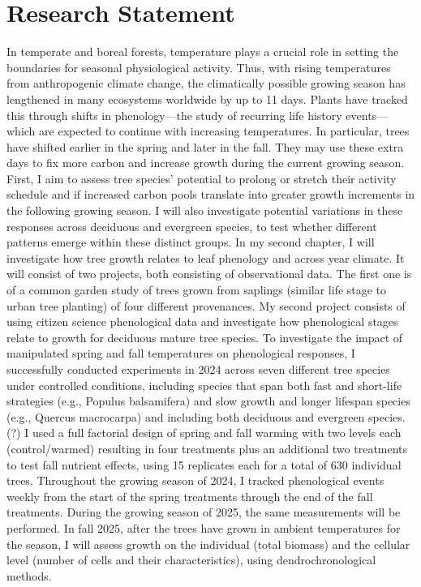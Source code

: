 \documentclass[11pt,letter]{article}
\begin{document}
\section {Research Statement}
In temperate and boreal forests, temperature plays a crucial role in setting the boundaries for seasonal physiological activity. Thus, with rising temperatures from anthropogenic climate change, the climatically possible growing season has lengthened in many ecosystems worldwide by up to 11 days. Plants have tracked this through shifts in phenology—the study of recurring life history events—which are expected to continue with increasing temperatures. In particular, trees have shifted earlier in the spring and later in the fall. They may use these extra days to fix more carbon and increase growth during the current growing season.\\
First, I aim to assess tree species’ potential to prolong or stretch their activity schedule and if increased carbon pools translate into greater growth increments in the following growing season. I will also investigate potential variations in these responses across
deciduous and evergreen species, to test whether different patterns emerge within these distinct groups.
In my second chapter, I will investigate how tree growth relates to leaf phenology and across year climate. It will consist of two projects, both consisting of observational data. The first one is of a common garden study of trees grown from saplings (similar life stage to urban tree planting) of four different provenances. My second project consists of using citizen science phenological data and investigate how phenological stages relate to growth for deciduous mature tree species. 
To investigate the impact of manipulated spring and fall temperatures on phenological responses, I successfully conducted experiments in 2024 across seven different tree species under controlled conditions, including species that span both fast and short-life strategies (e.g., Populus balsamifera) and slow growth and longer lifespan species (e.g., Quercus macrocarpa) and including both deciduous and evergreen species.(?) I used a full factorial design of spring and fall warming with two levels each (control/warmed) resulting in four treatments plus an additional two treatments to test fall nutrient effects, using 15 replicates each for a total of 630 individual trees. Throughout the growing season of 2024, I tracked phenological events weekly from the start of the spring treatments through the end of the fall treatments. During the growing season of 2025, the same measurements will be performed. In fall 2025, after the trees have grown in ambient temperatures for the season, I will assess growth on the individual (total biomass) and the cellular level (number of cells and their characteristics), using dendrochronological methods.
\end{document}
